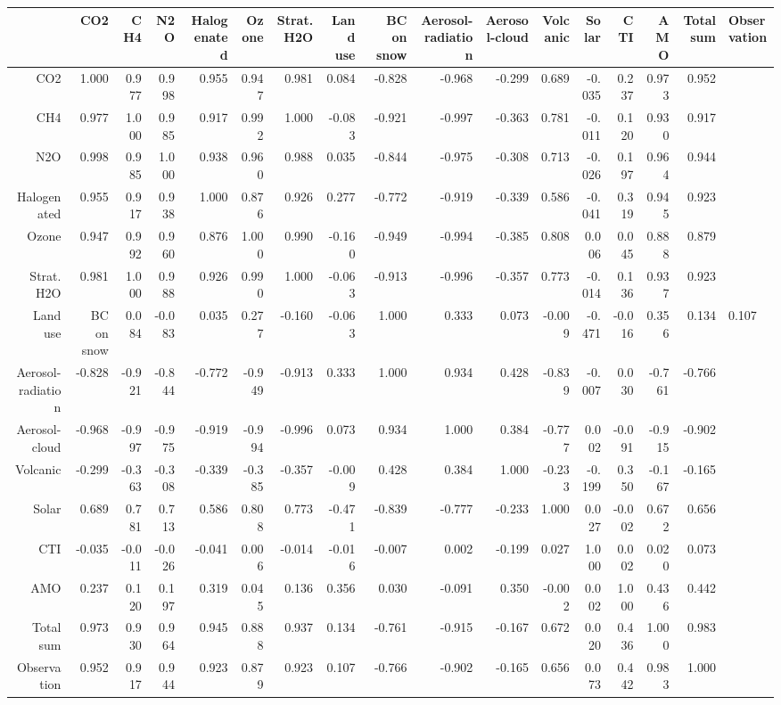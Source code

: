 \begin{table}[ht]
\centering
\begin{tabular}{rrrrrrrrrrrrrrrr}
  \hline
 & CO2 & CH4 & N2O & Halogenated & Ozone & Strat. H2O & Land use & BC on snow & Aerosol-radiation & Aerosol-cloud & Volcanic & Solar & CTI & AMO & Total sum & Observation \\ 
  \hline
CO2 & 1.000 & 0.977 & 0.998 & 0.955 & 0.947 & 0.981 & 0.084 & -0.828 & -0.968 & -0.299 & 0.689 & -0.035 & 0.237 & 0.973 & 0.952 \\ 
  CH4 & 0.977 & 1.000 & 0.985 & 0.917 & 0.992 & 1.000 & -0.083 & -0.921 & -0.997 & -0.363 & 0.781 & -0.011 & 0.120 & 0.930 & 0.917 \\ 
  N2O & 0.998 & 0.985 & 1.000 & 0.938 & 0.960 & 0.988 & 0.035 & -0.844 & -0.975 & -0.308 & 0.713 & -0.026 & 0.197 & 0.964 & 0.944 \\ 
  Halogenated & 0.955 & 0.917 & 0.938 & 1.000 & 0.876 & 0.926 & 0.277 & -0.772 & -0.919 & -0.339 & 0.586 & -0.041 & 0.319 & 0.945 & 0.923 \\ 
  Ozone & 0.947 & 0.992 & 0.960 & 0.876 & 1.000 & 0.990 & -0.160 & -0.949 & -0.994 & -0.385 & 0.808 & 0.006 & 0.045 & 0.888 & 0.879 \\ 
  Strat. H2O & 0.981 & 1.000 & 0.988 & 0.926 & 0.990 & 1.000 & -0.063 & -0.913 & -0.996 & -0.357 & 0.773 & -0.014 & 0.136 & 0.937 & 0.923 \\ 
  Land use & BC on snow & 0.084 & -0.083 & 0.035 & 0.277 & -0.160 & -0.063 & 1.000 & 0.333 & 0.073 & -0.009 & -0.471 & -0.016 & 0.356 & 0.134 & 0.107 \\ 
  Aerosol-radiation & -0.828 & -0.921 & -0.844 & -0.772 & -0.949 & -0.913 & 0.333 & 1.000 & 0.934 & 0.428 & -0.839 & -0.007 & 0.030 & -0.761 & -0.766 \\ 
  Aerosol-cloud & -0.968 & -0.997 & -0.975 & -0.919 & -0.994 & -0.996 & 0.073 & 0.934 & 1.000 & 0.384 & -0.777 & 0.002 & -0.091 & -0.915 & -0.902 \\ 
  Volcanic & -0.299 & -0.363 & -0.308 & -0.339 & -0.385 & -0.357 & -0.009 & 0.428 & 0.384 & 1.000 & -0.233 & -0.199 & 0.350 & -0.167 & -0.165 \\ 
  Solar & 0.689 & 0.781 & 0.713 & 0.586 & 0.808 & 0.773 & -0.471 & -0.839 & -0.777 & -0.233 & 1.000 & 0.027 & -0.002 & 0.672 & 0.656 \\ 
  CTI & -0.035 & -0.011 & -0.026 & -0.041 & 0.006 & -0.014 & -0.016 & -0.007 & 0.002 & -0.199 & 0.027 & 1.000 & 0.002 & 0.020 & 0.073 \\ 
  AMO & 0.237 & 0.120 & 0.197 & 0.319 & 0.045 & 0.136 & 0.356 & 0.030 & -0.091 & 0.350 & -0.002 & 0.002 & 1.000 & 0.436 & 0.442 \\ 
  Total sum & 0.973 & 0.930 & 0.964 & 0.945 & 0.888 & 0.937 & 0.134 & -0.761 & -0.915 & -0.167 & 0.672 & 0.020 & 0.436 & 1.000 & 0.983 \\ 
  Observation & 0.952 & 0.917 & 0.944 & 0.923 & 0.879 & 0.923 & 0.107 & -0.766 & -0.902 & -0.165 & 0.656 & 0.073 & 0.442 & 0.983 & 1.000 \\ 
   \hline
\end{tabular}
\end{table}

